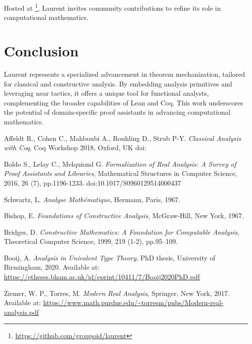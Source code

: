 \documentclass[12pt,twoside,draft]{cmpart}
\begin{document}
Hosted at \footnote{\url{https://github.com/groupoid/laurent}}, Laurent invites community
contributions to refine its role in computational mathematics.

\section{Conclusion}
Laurent represents a specialized advancement in theorem mechanization, tailored for classical and constructive analysis.
By embedding analysis primitives and leveraging near tactics, it offers a unique tool for functional analysts,
complementing the broader capabilities of Lean and Coq. This work underscores the potential of domain-specific
proof assistants in advancing computational mathematics.

\begin{thebibliography}{999}

 Affeldt R., Cohen C., Mahboubi A., Rouhling D.,  Strub P-Y. \emph{Classical Analysis with Coq},
Coq Workshop 2018, Oxford, UK doi:

 Boldo S., Lelay C., Melquiond G. \emph{Formalization of Real Analysis: A Survey of Proof Assistants and Libraries},
Mathematical Structures in Computer Science, 2016, 26 (7), pp.1196-1233. doi:10.1017/S0960129514000437

 Schwartz, L. \emph{Analyse Mathématique}, Hermann, Paris, 1967.

 Bishop, E. \emph{Foundations of Constructive Analysis}, McGraw-Hill, New York, 1967.

 Bridges, D. \emph{Constructive Mathematics: A Foundation for Computable Analysis}, Theoretical Computer Science, 1999, 219 (1-2), pp.95--109.

 Booij, A. \emph{Analysis in Univalent Type Theory}, PhD thesis, University of Birmingham, 2020. Available at: \url{https://etheses.bham.ac.uk/id/eprint/10411/7/Booij2020PhD.pdf}

 Ziemer, W. P., Torres, M. \emph{Modern Real Analysis}, Springer, New York, 2017. Available at: \url{https://www.math.purdue.edu/~torresm/pubs/Modern-real-analysis.pdf}

\end{thebibliography}
\end{document}
